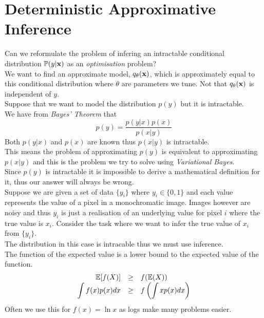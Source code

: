 \documentclass[11pt,a4paper]{article}
\begin{document}
\section{Deterministic Approximative Inference}

Can we reformulate the problem of infering an intractable conditional distribution $\mathbb{P}(y|\textbf{x})$ as an \textit{optimisation} problem?\\
We want to find an approximate model, $q_\theta(\textbf{x})$, which is approximately equal to this conditional distribution where $\theta$ are parameters we tune. Not that $q_\theta(\textbf{x})$ is independent of $y$.\\

Suppose that we want to model the distribution $p(y)$ but it is intractable.\\
We have from \textit{Bayes' Theorem} that
$$p(y)=\dfrac{p(y|x)p(x)}{p(x|y)}$$
Both $p(y|x)$ and $p(x)$ are known thus $p(x|y)$ is intractable.\\
This means the problem of approximating $p(y)$ is equivalent to approximating $p(x|y)$ and this is the problem we try to solve using \textit{Variational Bayes}.\\
\nb Since $p(y)$ is intractable it is impossible to derive a mathematical definition for it, thus our answer will always be wrong.\\

Suppose we are given a set of data $\{y_i\}$ where $y_i\in\{0,1\}$ and each value represents the value of a pixel in a monochromatic image. Images however are noisy and thus $y_i$ is just a realisation of an underlying value for pixel $i$ where the true value is $x_i$. Consider the task where we want to infer the true value of $x_i$ from $\{y_i\}$.\\
\nb The distribution in this case is intracable thus we must use inference.\\

The function of the expected value is a lower bound to the expected value of the function.
\[\begin{array}{rcl}
\mathbb{E}[f(X)]&\geq&f(\mathbb{E}(X))\\
\displaystyle\int f(x)p(x)dx&\geq&f\left(\displaystyle\int xp(x)dx\right)
\end{array}\]
\nb Often we use this for $f(x)=\ln x$ as logs make many problems easier.\\
\end{document}
